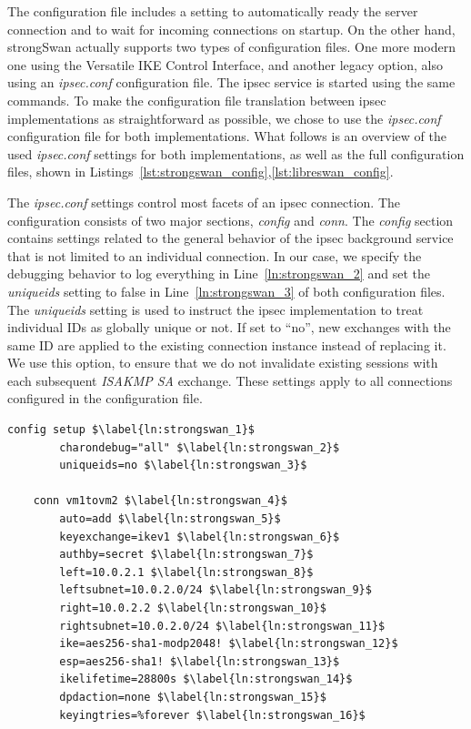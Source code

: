 The configuration file includes a setting to automatically ready the server connection and to wait for incoming connections on startup. On the other hand, strongSwan actually supports two types of configuration files. One more modern one using the Versatile IKE Control Interface, and another legacy option, also using an \emph{ipsec.conf} configuration file. The \ac{ipsec} service is started using the same commands. To make the configuration file translation between \ac{ipsec} implementations as straightforward as possible, we chose to use the \emph{ipsec.conf} configuration file for both implementations. What follows is an overview of the used \emph{ipsec.conf} settings for both implementations, as well as the full configuration files, shown in Listings~\ref{lst:strongswan_config},\ref{lst:libreswan_config}.

The \emph{ipsec.conf} settings control most facets of an \ac{ipsec} connection. The configuration consists of two major sections, \emph{config} and \emph{conn}. The \emph{config} section contains settings related to the general behavior of the \ac{ipsec} background service that is not limited to an individual connection. In our case, we specify the debugging behavior to log everything in Line~\ref{ln:strongswan_2} and set the \emph{uniqueids} setting to false in Line~\ref{ln:strongswan_3} of both configuration files. The \emph{uniqueids} setting is used to instruct the \ac{ipsec} implementation to treat individual IDs as globally unique or not. If set to ``no'', new exchanges with the same ID are applied to the existing connection instance instead of replacing it. We use this option, to ensure that we do not invalidate existing sessions with each subsequent \emph{ISAKMP SA} exchange. These settings apply to all connections configured in the configuration file.

\begin{lstlisting}[mathescape=true, float=ht, caption=strongSwan configuration, label=lst:strongswan_config]
	config setup $\label{ln:strongswan_1}$
		charondebug="all" $\label{ln:strongswan_2}$
		uniqueids=no $\label{ln:strongswan_3}$
	
	conn vm1tovm2 $\label{ln:strongswan_4}$
		auto=add $\label{ln:strongswan_5}$
		keyexchange=ikev1 $\label{ln:strongswan_6}$
		authby=secret $\label{ln:strongswan_7}$
		left=10.0.2.1 $\label{ln:strongswan_8}$
		leftsubnet=10.0.2.0/24 $\label{ln:strongswan_9}$
		right=10.0.2.2 $\label{ln:strongswan_10}$
		rightsubnet=10.0.2.0/24 $\label{ln:strongswan_11}$
		ike=aes256-sha1-modp2048! $\label{ln:strongswan_12}$
		esp=aes256-sha1! $\label{ln:strongswan_13}$
		ikelifetime=28800s $\label{ln:strongswan_14}$
		dpdaction=none $\label{ln:strongswan_15}$
		keyingtries=%forever $\label{ln:strongswan_16}$
\end{lstlisting}

